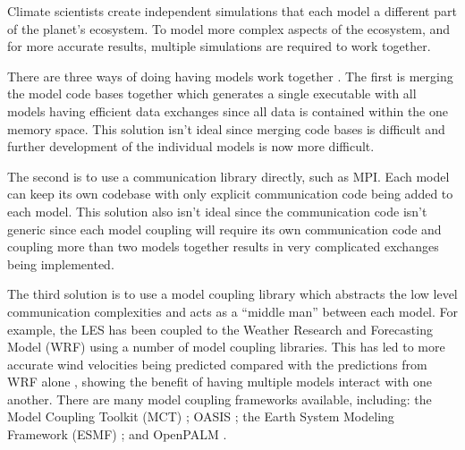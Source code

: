Climate scientists create independent simulations that each model a different
part of the planet's ecosystem. To model more complex aspects of the ecosystem,
and for more accurate results, multiple simulations are required to work
together.

There are three ways of doing having models work together \cite{Thevenin}. The
first is merging the model code bases together which generates a single
executable with all models having efficient data exchanges since all data is
contained within the one memory space. This solution isn't ideal since merging
code bases is difficult and further development of the individual models is now
more difficult.

The second is to use a communication library directly, such as MPI. Each model
can keep its own codebase with only explicit communication code being added to
each model. This solution also isn't ideal since the communication code isn't
generic since each model coupling will require its own communication code and
coupling more than two models together results in very complicated exchanges
being implemented.

The third solution is to use a model coupling library which abstracts the low
level communication complexities and acts as a ``middle man'' between each
model. For example, the LES has been coupled to the Weather Research and
Forecasting Model (WRF) using a number of model coupling libraries. This has led
to more accurate wind velocities being predicted compared with the predictions
from WRF alone \cite{Kinbara2010,Nakayama1998}, showing the benefit of having
multiple models interact with one another. There are many model coupling
frameworks available, including: the Model Coupling Toolkit (MCT)
\cite{Jacob2005,Larson2005}; OASIS \cite{Valcke2013,Valcke}; the Earth System
Modeling Framework (ESMF) \cite{Ramework2004}; and OpenPALM
\cite{Piacentini2011}.
